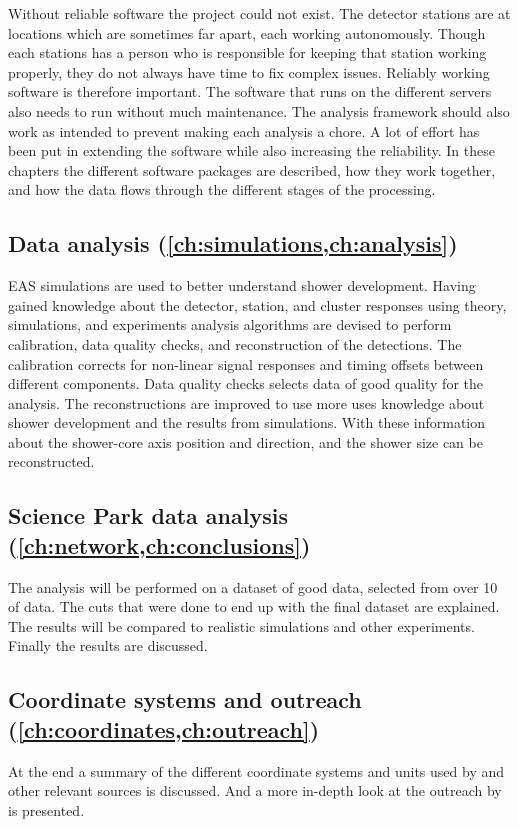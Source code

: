 Without reliable software the \hisparc project could not exist. The detector stations are at locations which are sometimes far apart, each working autonomously. Though each stations has a person who is responsible for keeping that station working properly, they do not always have time to fix complex issues. Reliably working software is therefore important. The software that runs on the different \hisparc servers also needs to run without much maintenance. The analysis framework should also work as intended to prevent making each analysis a chore. A lot of effort has been put in extending the software while also increasing the reliability. In these chapters the different software packages are described, how they work together, and how the data flows through the different stages of the processing.


\subsection{Data analysis
            (\cref{ch:simulations,ch:analysis})}

EAS simulations are used to better understand shower development. Having gained knowledge about the detector, station, and cluster responses using theory, simulations, and experiments analysis algorithms are devised to perform calibration, data quality checks, and reconstruction of the detections. The calibration corrects for non-linear signal responses and timing offsets between different components. Data quality checks selects data of good quality for the analysis. The reconstructions are improved to use more uses knowledge about shower development and the results from simulations. With these information about the shower-core axis position and direction, and the shower size can be reconstructed.


\subsection{Science Park data analysis
            (\cref{ch:network,ch:conclusions})}

The analysis will be performed on a dataset of good data, selected from over \SI{10}{\year} of \hisparc data. The cuts that were done to end up with the final dataset are explained. The results will be compared to realistic simulations and other experiments. Finally the results are discussed.


\subsection{Coordinate systems and outreach 
            (\cref{ch:coordinates,ch:outreach})}

At the end a summary of the different coordinate systems and units used by \hisparc and other relevant sources is discussed. And a more in-depth look at the outreach by \hisparc is presented.
















